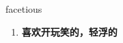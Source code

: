 
\begin{frame}
{\huge facetious}
\begin{center}
\begin{enumerate}\Large
  \item \textbf{喜欢开玩笑的，轻浮的}
\end{enumerate}
\end{center}
\end{frame}
